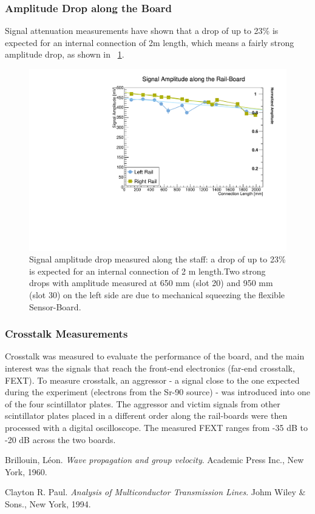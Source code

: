 \documentclass[../BTOF_summary.tex]{subfiles}
\begin{document}
\subsubsection{Amplitude Drop along the Board}
Signal attenuation measurements have shown that a drop of up to 23\% is expected for an internal connection of 2m length, which means a fairly strong amplitude drop, as shown in \fig~\ref{fig:SA}.

\begin{figure}[h!]
    \centering
    \includegraphics[scale=0.5]{Pictures/SignalAmplitude.pdf}
    \caption{Signal amplitude drop measured along the staff: a drop of up to 23\% is expected for an internal connection of 2 m length.Two strong drops with amplitude measured at 650 mm (slot 20) and 950 mm (slot 30) on the left side are due to mechanical squeezing the flexible Sensor-Board.}
    \label{fig:SA}
\end{figure}

\subsubsection{Crosstalk Measurements}
Crosstalk was measured to evaluate the performance of the board, and the main interest was the signals that  reach the front-end electronics (far-end crosstalk, FEXT). To measure crosstalk, an aggressor - a signal close to the one expected during the experiment (electrons from the Sr-90 source) - was introduced  into one of the four scintillator plates. The aggressor and victim signals from other scintillator plates placed in a different order along the rail-boards were then processed with a digital oscilloscope. The measured FEXT ranges from -35 dB to -20 dB across the two boards.

\begin{thebibliography}{9}
Brillouin, Léon. 
\textit{Wave propagation and group velocity}. 
Academic Press Inc., New York, 1960.

Clayton R. Paul. 
\textit{Analysis of Multiconductor Transmission Lines}. 
Johm Wiley \& Sons., New York, 1994.

\end{thebibliography}
\end{document}
